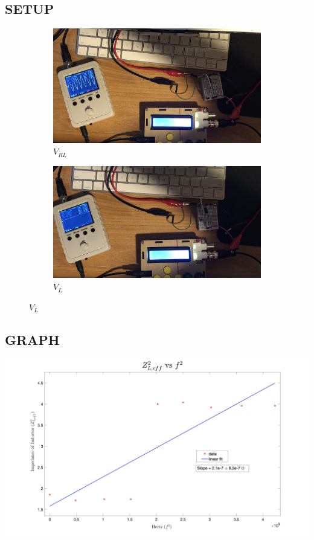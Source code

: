 \documentclass{article}
\def\F#1{\(#1\)}
\begin{document}
\begin{center}
  \subsection*{SETUP}
  \begin{figure}[!htp]
    \begin{subfigure}{0.5\textwidth}
    \includegraphics[scale=0.0665]{V_RL.jpeg}
    \caption*{\F{V_{RL}}}\label{fig:subim1}
    \end{subfigure}
    \begin{subfigure}{0.5\textwidth}
    \includegraphics[scale=0.066]{V_L.jpeg}
    \caption*{\F{V_{L}}}\label{fig:subim2}
    \end{subfigure}
  \end{figure}
  \subsection*{GRAPH}
  \includegraphics[width=\textwidth]{graph.jpg}
\end{center}
\end{document}
